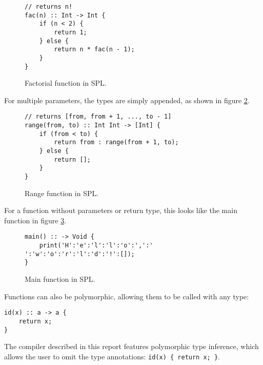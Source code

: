 \begin{figure}[!ht]
\centering
\begin{lstlisting}[language=spl]
// returns n!
fac(n) :: Int -> Int {
    if (n < 2) {
        return 1;
    } else {
        return n * fac(n - 1);
    }
}
\end{lstlisting}
\caption{Factorial function in SPL.}
\label{fig:fac}
\end{figure}

For multiple parameters, the types are simply appended, as shown in figure \ref{fig:range}.

\begin{figure}[!ht]
\centering
\begin{lstlisting}[language=spl]
// returns [from, from + 1, ..., to - 1]
range(from, to) :: Int Int -> [Int] {
    if (from < to) {
        return from : range(from + 1, to);
    } else {
        return [];
    }
}
\end{lstlisting}
\caption{Range function in SPL.}
\label{fig:range}
\end{figure}

For a function without parameters or return type, this looks like the main function in figure \ref{fig:main}.

\begin{figure}[!ht]
\centering
\begin{lstlisting}
main() :: -> Void {
    print('H':'e':'l':'l':'o':',':' ':'w':'o':'r':'l':'d':'!':[]);
}
\end{lstlisting}
\caption{Main function in SPL.}
\label{fig:main}
\end{figure}

Functions can also be polymorphic, allowing them to be called with any type:

\begin{lstlisting}
id(x) :: a -> a {
    return x;
}
\end{lstlisting}

The compiler described in this report features polymorphic type inference, which allows the user to omit the type annotations: \lstinline|id(x) { return x; }|.



